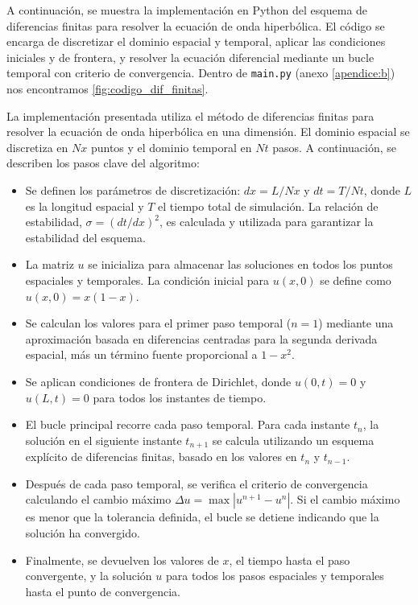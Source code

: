 A continuación, se muestra la implementación en Python del esquema de diferencias finitas para resolver la ecuación de onda hiperbólica. El código se encarga de discretizar el dominio espacial y temporal, aplicar las condiciones iniciales y de frontera, y resolver la ecuación diferencial mediante un bucle temporal con criterio de convergencia.
Dentro de \texttt{main.py} (anexo \ref{apendice:b}) nos encontramos \ref{fig:codigo_dif_finitas}.


La implementación presentada utiliza el método de diferencias finitas para resolver la ecuación de onda hiperbólica en una dimensión. El dominio espacial se discretiza en $Nx$ puntos y el dominio temporal en $Nt$ pasos. A continuación, se describen los pasos clave del algoritmo:

\begin{itemize}
    \item Se definen los parámetros de discretización: $dx = L / Nx$ y $dt = T / Nt$, donde $L$ es la longitud espacial y $T$ el tiempo total de simulación. La relación de estabilidad, $\sigma = (dt/dx)^2$, es calculada y utilizada para garantizar la estabilidad del esquema.
    
    \item La matriz $u$ se inicializa para almacenar las soluciones en todos los puntos espaciales y temporales. La condición inicial para $u(x,0)$ se define como $u(x, 0) = x(1 - x)$.

    \item Se calculan los valores para el primer paso temporal ($n=1$) mediante una aproximación basada en diferencias centradas para la segunda derivada espacial, más un término fuente proporcional a $1 - x^2$.
    
    \item Se aplican condiciones de frontera de Dirichlet, donde $u(0,t) = 0$ y $u(L,t) = 0$ para todos los instantes de tiempo.
    
    \item El bucle principal recorre cada paso temporal. Para cada instante $t_n$, la solución en el siguiente instante $t_{n+1}$ se calcula utilizando un esquema explícito de diferencias finitas, basado en los valores en $t_n$ y $t_{n-1}$.

    \item Después de cada paso temporal, se verifica el criterio de convergencia calculando el cambio máximo $\Delta u = \max |u^{n+1} - u^n|$. Si el cambio máximo es menor que la tolerancia definida, el bucle se detiene indicando que la solución ha convergido.

    \item Finalmente, se devuelven los valores de $x$, el tiempo hasta el paso convergente, y la solución $u$ para todos los pasos espaciales y temporales hasta el punto de convergencia.
\end{itemize}

